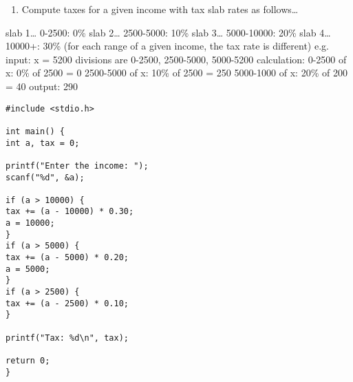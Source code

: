 \documentclass[11pt]{article}
\begin{document}
\begin{enumerate}
\item Compute taxes for a given income with tax slab rates as follows\ldots{}
\end{enumerate}
slab 1\ldots{} 0-2500: 0\%
slab 2\ldots{} 2500-5000: 10\%
slab 3\ldots{} 5000-10000: 20\%
slab 4\ldots{} 10000+: 30\%
(for each range of a given income, the tax rate is different)
e.g. input: x = 5200
divisions are 0-2500, 2500-5000, 5000-5200
calculation:
0-2500 of x:
0\% of 2500 = 0
2500-5000 of x:
10\% of 2500 = 250
5000-1000 of x:
20\% of 200 = 40
output: 290

\begin{verbatim}
#include <stdio.h>

int main() {
int a, tax = 0;

printf("Enter the income: ");
scanf("%d", &a);

if (a > 10000) {
tax += (a - 10000) * 0.30;
a = 10000;
}
if (a > 5000) {
tax += (a - 5000) * 0.20;
a = 5000;
}
if (a > 2500) {
tax += (a - 2500) * 0.10;
}

printf("Tax: %d\n", tax);

return 0;
}
\end{verbatim}
\end{document}
